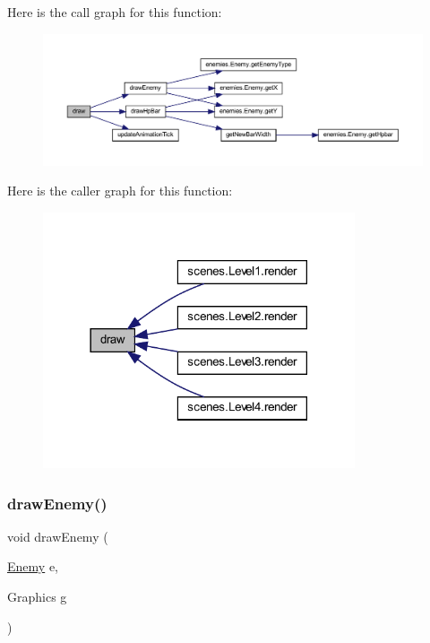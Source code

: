 Here is the call graph for this function\+:\nopagebreak
\begin{figure}[H]
\begin{center}
\leavevmode
\includegraphics[width=350pt]{classmanagers_1_1_enemy_manager_a72fe1ffca978e99fd16994a10e7f8051_cgraph}
\end{center}
\end{figure}
Here is the caller graph for this function\+:\nopagebreak
\begin{figure}[H]
\begin{center}
\leavevmode
\includegraphics[width=261pt]{classmanagers_1_1_enemy_manager_a72fe1ffca978e99fd16994a10e7f8051_icgraph}
\end{center}
\end{figure}
\mbox{\label{classmanagers_1_1_enemy_manager_a7ebdd9acefa4682b23b1ad2c0be558f4}} 
\subsubsection{\texorpdfstring{draw\+Enemy()}{drawEnemy()}}
{\footnotesize\ttfamily void draw\+Enemy (\begin{DoxyParamCaption}\item[{\hyperlink{classenemies_1_1_enemy}{Enemy}}]{e,  }\item[{Graphics}]{g }\end{DoxyParamCaption})\hspace{0.3cm}{\ttfamily [private]}}



